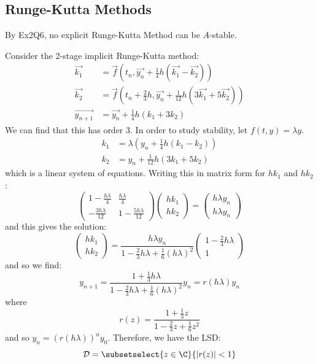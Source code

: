 \documentclass[../Main.tex]{subfiles}
\begin{document}
\subsection{Runge-Kutta Methods}
By Ex2Q6, no explicit Runge-Kutta Method can be $A$-stable.
\begin{example}
    Consider the 2-stage implicit Runge-Kutta method:
    \begin{align*}
        \vec{k_1} &= \vec{f}(t_n, \vec{y_n} + \frac14 h (\vec{k_1} - \vec{k_2})) \\
        \vec{k_2} &= \vec{f}(t_n + \frac23 h, \vec{y_n} + \frac1{12} h (3\vec{k_1} + 5 \vec{k_2})) \\
        \vec{y_{n+1}} &= \vec{y_n} + \frac14 h (k_1 + 3k_2)
    \end{align*}
    We can find that this has order $3$. In order to study stability, let $f(t, y) = \lambda y$.
    \begin{align*}
        k_1 &= \lambda (y_n + \frac14 h (k_1 - k_2)) \\
        k_2 &= y_n + \frac{1}{12} h (3k_1 + 5k_2)
    \end{align*}
    which is a linear system of equations. Writing this in matrix form for $hk_1$ and $hk_2$:
    \begin{equation*}
        \begin{pmatrix}
            1-\frac{h\lambda}{4} & \frac{h\lambda}{4} \\
            -\frac{3h\lambda}{12} & 1 - \frac{5h\lambda}{12}
        \end{pmatrix}
        \begin{pmatrix}hk_1 \\ hk_2\end{pmatrix}
        =
        \begin{pmatrix}h\lambda y_n \\ h\lambda y_n\end{pmatrix}
    \end{equation*}
    and this gives the solution:
    \begin{equation*}
        \begin{pmatrix}hk_1 \\ hk_2\end{pmatrix} = \frac{h\lambda y_n}{1 - \frac23 h\lambda + \frac16 (h\lambda)^2} \begin{pmatrix}1 - \frac23 h\lambda \\ 1\end{pmatrix}
    \end{equation*}
    and so we find:
    \begin{equation*}
        y_{n+1} = \frac{1 + \frac13 h\lambda}{1 - \frac23 h\lambda + \frac16 (h\lambda)^2} y_n = r(h\lambda) y_n
    \end{equation*}
    where
    \begin{equation*}
        r(z) = \frac{1 + \frac13 z}{1 - \frac23 z + \frac16 z^2}
    \end{equation*}
    and so $y_n = (r(h\lambda))^n y_0$. Therefore, we have the LSD:
    \begin{equation*}
        \dom = \subsetselect{z \in \C}{\abs{r(z)} < 1}
    \end{equation*}
    \label{expImplicitRKStability}
\end{example}
\end{document}
